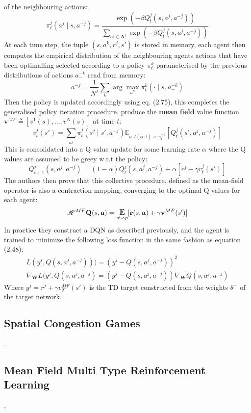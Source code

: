 of the neighbouring actions:
\begin{equation}
    \pi^j_t(a^j \mid s, a^{-j}) =\frac{\exp(-\beta Q^j_t(s,a^j,a^{-j}))}{\sum_{a^j \in \mathbf{A}^j}\exp(-\beta Q^j_t(s,a^j,a^{-j}))}
\end{equation}
At each time step, the tuple $(s, {a^k}, {r^j}, s')$ is stored in memory,
each agent then computes the empirical distribution of the neighbouring
agents actions that have been optimalling selected according to a policy 
$\pi^k_t$ parameterised by the previous distributions of actions $a^{-k}_-$ read from memory:
\begin{equation}
    a^{-j} = \frac{1}{N^j} \sum_k \arg \max_{a^k} \pi^k_t(\cdot \mid s, a^{-k}_-)
\end{equation}
Then the policy is updated accordingly using eq. (2.75), this completes the generalised
policy iteration procedure. \cite{Yang2018} produce the \textbf{mean field} value function 
$\mathbf{v}^{MF} \triangleq [v^1(s),\hdots, v^N(s)]$ at time $t$:
\begin{equation}
    v^j_t(s')= \sum_{a^j}\pi^j_t(s^j \mid s', a^{-j}) \mathbb{E}_{a^{-j}(\mathbf{a}^{-j}) \backsim \boldsymbol \pi_t^{-j}}[Q^j_t(s',a^j,a^{-j})]
\end{equation}
This is consolidated into a Q value update for some learning rate $\alpha$ where the Q values are
assumed to be greey w.r.t the policy:
\begin{equation}
    Q^j_{t+1}(s,a^j,a^{-j})= (1-\alpha)Q^j_t(s,a^j,a^{-j}) +\alpha[r^j+ \gamma v^j_t(s')]
\end{equation}
The authors then prove that this collective procedure, defined as the mean-field operator
is also a contraction mapping, converging to the optimal Q values for each agent:
\begin{equation}
    \mathscr{H}^{MF} \mathbf{Q}(s, \mathbf{a}) = \E_{s'\backsim p}[\mathbf{r}(s,\mathbf{a}) +\gamma \mathbf{v}^{MF}(s')]
\end{equation}
In practice they construct a DQN as described previously, and the agent is trained to
minimize the following loss function in the same fashion as equation (2.48):
\begin{equation}
    \begin{gathered}
        L(y^j, Q(s, a^j, a^{-j}))) = (y^j - Q(s, a^j, a^{-j}))^2 \\
        \nabla_{\mathbf{W}} L(y^j, Q(s, a^j, a^{-j}) = (y^j - Q(s, a^j, a^{-j})) \nabla_{\mathbf{W}} Q(s, a^j, a^{-j})
    \end{gathered}
\end{equation}
Where $y^j = r^j + \gamma v^{MF}_{\theta^-}(s')$ is the TD target constructed from the weights $\theta^-$ of the target network.

\subsection{Spatial Congestion Games}
\cite{Mguni2018}.


\subsection{Mean Field Multi Type Reinforcement Learning}
\cite{Sriram2020}, \cite{Xueguang2018}